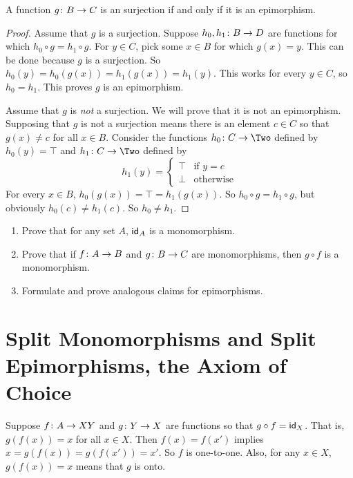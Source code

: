 \begin{lemma}
	A function ${g}\colon{B}\to{C}$ is an surjection if and only if it is an epimorphism.
	\begin{proof}
		Assume that $g$ is a surjection. 
		Suppose ${h_0,h_1}\colon{B}\to{D}$ are functions for which $h_0\circ g = h_1\circ g$. 
		For $y\in C$, pick some $x\in B$ for which $g(x)=y$.
		This can be done because $g$ is a surjection.
		So $h_0(y) = h_0(g(x)) = h_1(g(x)) = h_1(y)$.
		This works for every $y\in C$, so $h_0=h_1$.
		This proves $g$ is an epimorphism.
		
		Assume that $g$ is \emph{not} a surjection.
		We will prove that it is not an epimorphism.
		Supposing that $g$ is not a surjection means there is an element $c\in C$ so that $g(x)\neq c$ for all $x\in B$. 
		Consider the functions $\fromto {h_0}C\Two$ defined by $h_0(y)=\top$ and $\fromto {h_1}C\Two$ defined by 
		\[h_1(y) = \begin{cases}
			\top & \text{if  $y=c$}\\
			\bot &\text {otherwise}
		\end{cases}
		\]
		For every $x\in B$, $h_0(g(x)) = \top = h_1(g(x))$. So $h_0\circ g = h_1\circ g$, but obviously $h_0(c)\neq h_1(c)$. So $h_0\neq h_1$.  
	\end{proof}
\end{lemma}

\begin{exercises}
	\begin{enumerate}
		\item Prove that for any set $A$, $\textsf{id}_A$ is a monomorphism.
		\item Prove that if ${f}\colon{A}\to{B}$ and ${g}\colon{B}\to{C}$ are monomorphisms, then $g\circ f$ is a monomorphism.
		\item Formulate and prove analogous claims for epimorphisms.
	\end{enumerate}
\end{exercises}

\section{Split Monomorphisms and Split Epimorphisms, the Axiom of Choice}

Suppose ${f}\colon{A}\to{X}Y$ and ${g}\colon{Y}\to{X}$ are functions so that $g\circ f =\textsf{id}_X$.
That is, $g(f(x)) = x$ for all $x\in X$. Then $f(x) = f(x')$ implies $x=g(f(x))=g(f(x'))=x'$. So $f$ is one-to-one. Also, for any $x\in X$, $g(f(x))=x$
means that $g$ is onto.

